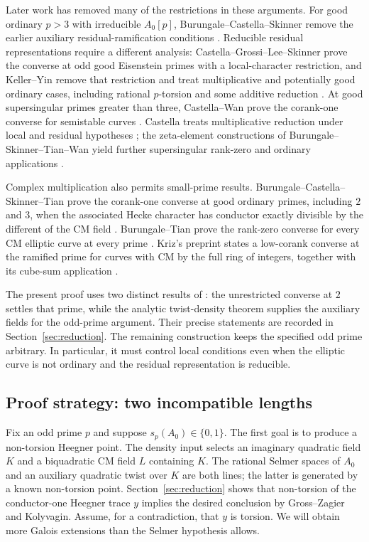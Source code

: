 Later work has removed many of the restrictions in these arguments.
For good ordinary $p>3$ with irreducible $A_0[p]$,
Burungale--Castella--Skinner remove the earlier auxiliary
residual-ramification conditions \citep{BCS2025}.
Reducible residual representations require a different analysis:
Castella--Grossi--Lee--Skinner prove the converse at odd good
Eisenstein primes with a local-character restriction, and Keller--Yin
remove that restriction and treat multiplicative and potentially good
ordinary cases, including rational $p$-torsion and some additive
reduction \citep{CGLS2022,KellerYinSemistable2024,KellerYin2024}.
At good supersingular primes greater than three, Castella--Wan prove
the corank-one converse for semistable curves \citep{CastellaWan2024}.
Castella treats multiplicative reduction under local and residual
hypotheses \citep[Theorems~1.1 and~1.3]{Castella2024}; the zeta-element
constructions of Burungale--Skinner--Tian--Wan yield further
supersingular rank-zero and ordinary applications
\citep[Theorems~1.6 and~1.10]{BSTW2024}.

Complex multiplication also permits small-prime results.
Burungale--Castella--Skinner--Tian prove the corank-one converse at
good ordinary primes, including $2$ and $3$, when the associated
Hecke character has conductor exactly divisible by the different of
the CM field \citep[Theorem~A]{BCST2022}.
Burungale--Tian prove the rank-zero converse for every CM elliptic
curve at every prime \citep{BurungaleTian2026}.
Kriz's preprint states a low-corank converse at the ramified prime
for curves with CM by the full ring of integers, together with its
cube-sum application \citep[Theorems~1.1 and~1.3]{Kriz2022}.

The present proof uses two distinct results of
\citet{OpenAIGoldfeldDensity2026}: the unrestricted converse at $2$
settles that prime, while the analytic twist-density theorem supplies
the auxiliary fields for the odd-prime argument. Their precise
statements are recorded in Section~\ref{sec:reduction}.
The remaining construction keeps the specified odd prime arbitrary.
In particular, it must control local conditions even when the
elliptic curve is not ordinary and the residual representation is
reducible.

\subsection{Proof strategy: two incompatible lengths}

Fix an odd prime $p$ and suppose $s_p(A_0)\in\{0,1\}$.
The first goal is to produce a non-torsion Heegner point. The density
input selects an imaginary quadratic field $K$ and a biquadratic CM
field $L$ containing $K$. The rational Selmer spaces of $A_0$ and an
auxiliary quadratic twist over $K$ are both lines; the latter is
generated by a known non-torsion point.
Section~\ref{sec:reduction} shows that non-torsion
of the conductor-one Heegner trace $y$ implies the desired conclusion
by Gross--Zagier and Kolyvagin. Assume, for a contradiction, that $y$
is torsion. We will obtain more Galois extensions than the Selmer
hypothesis allows.

